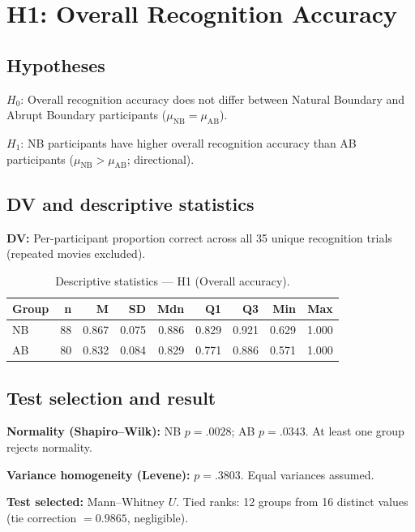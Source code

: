 \documentclass[12pt,a4paper]{article}
\begin{document}
\section{H1: Overall Recognition Accuracy}

\subsection{Hypotheses}

$H_0$: Overall recognition accuracy does not differ between Natural Boundary and Abrupt Boundary participants ($\mu_{\text{NB}} = \mu_{\text{AB}}$).

$H_1$: NB participants have higher overall recognition accuracy than AB participants ($\mu_{\text{NB}} > \mu_{\text{AB}}$; directional).

\subsection{DV and descriptive statistics}

\textbf{DV:} Per-participant proportion correct across all 35 unique recognition trials (repeated movies excluded).


\begin{table}[h!]
\centering
\small
\begin{tabular}{lrrrrrrrr}
\hline
\textbf{Group} & \textbf{n} & \textbf{M} & \textbf{SD} & \textbf{Mdn} & \textbf{Q1} & \textbf{Q3} & \textbf{Min} & \textbf{Max} \\
\hline
    NB & 88 & 0.867 & 0.075 & 0.886 & 0.829 & 0.921 & 0.629 & 1.000 \\
    AB & 80 & 0.832 & 0.084 & 0.829 & 0.771 & 0.886 & 0.571 & 1.000 \\
\hline
\end{tabular}
\caption{Descriptive statistics --- H1 (Overall accuracy).}
\label{tab:h1_desc}
\end{table}

\subsection{Test selection and result}

\textbf{Normality (Shapiro--Wilk):} NB $p = .0028$; AB $p = .0343$. At least one group rejects normality.

\textbf{Variance homogeneity (Levene):} $p = .3803$. Equal variances assumed.


\textbf{Test selected:} Mann--Whitney $U$. Tied ranks: 12 groups from 16 distinct values (tie correction $= 0.9865$, negligible).
\end{document}
